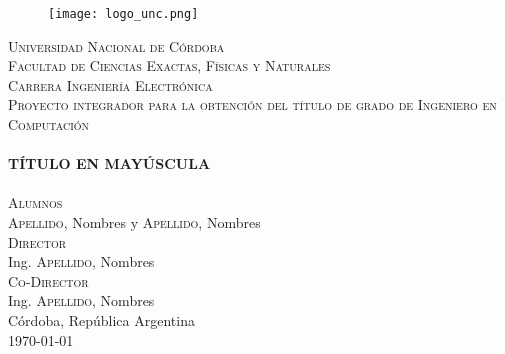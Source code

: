 \begin{titlepage}
    \begin{center}
        
    \begin{figure}[h]
        \begin{center}
            \texttt{[image: logo\_unc.png]}
        \end{center}
    \end{figure}
    \vspace{0.5em}
    
    \textsc{\LARGE Universidad Nacional de Córdoba}\\[0.3cm] %
    \textsc{\Large Facultad de Ciencias Exactas, Físicas y Naturales}\\[0.3cm] %
    \textsc{\Large Carrera Ingeniería Electrónica}\\[0.75cm] %
    
    \textsc{\large Proyecto integrador para la obtención del título de grado de Ingeniero en Computación}\\[1.0cm]
    
    \HRule \\[0.4cm]
    \textsc{\textbf{TÍTULO EN MAYÚSCULA}}\\[0.4cm] %
    \HRule \\[1.5cm]
    
    \textsc{\Large Alumnos}\\[0.1cm]
    \large \textsc{Apellido}, Nombres y \textsc{Apellido}, Nombres \\[0.5cm]
    
    \textsc{\large Director}\\[0.1cm]
    Ing. \textsc{Apellido}, Nombres \\[0.5cm]
    
    \textsc{\large Co-Director}\\[0.1cm]
    Ing. \textsc{Apellido}, Nombres \\[2.5cm]
    
    Córdoba, República Argentina \\
    \monthyeardate\today %
    
    
    \end{center}
\end{titlepage}

\clearpage{\thispagestyle{empty}\cleardoublepage}       %